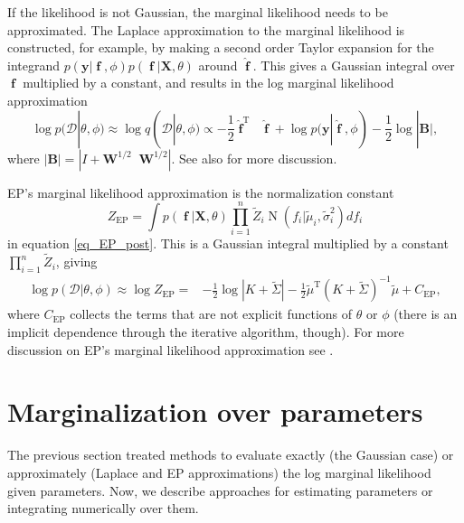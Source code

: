 \documentclass[twoside,11pt]{article}
\DeclareMathOperator{\Kff}{\mathbf{K}_{f,f}}
\DeclareMathOperator{\iKff}{\mathbf{K}_{f,f}^{-1}}
\DeclareMathOperator{\f}{\mathbf{f}}
\DeclareMathOperator{\N}{N}
\newcommand{\mb}{\mathbf}
\begin{document}
If the likelihood is not Gaussian, the marginal likelihood needs to be
approximated. The Laplace approximation to the marginal likelihood is
constructed, for example, by making a second order Taylor expansion
for the integrand $p(\mb{y}|\f,\phi)p(\f|\mb{X},\theta)$ around
$\hat{\f}$. This gives a Gaussian integral over $\f$ multiplied by a
constant, and results in the log marginal likelihood approximation
%
\begin{equation}\label{eq_Laplace_marginal_likelihood}
\log p(\mathcal{D}|\theta,\phi) \approx \log
q(\mathcal{D}|\theta,\phi) \propto
-\frac{1}{2}\hat{\f}^{\text{T}}\iKff\hat{\f} + \log p(\mb{y}|\hat{\f},\phi)
- \frac{1}{2} \log |\mb{B}|,  
\end{equation}
%
where $|\mb{B}| = |I+\mb{W}^{1/2}\Kff \mb{W}^{1/2}|$. See also
\citep[][]{Tierney+Kadane:1986,Rue+Martino+Chopin:2009,Vanhatalo+Jylanki+Vehtari:2009}
for more discussion.

EP's marginal likelihood approximation is the normalization constant
%
\begin{equation}
Z_{\text{EP}} = \int p(\f|\mb{X}, \theta)\prod_{i=1}^n \tilde{Z}_i
\N(f_i|\tilde{\mu}_i,\tilde{\sigma}_i^2) d f_i 
\end{equation}
%
in equation \eqref{eq_EP_post}. This is a Gaussian integral multiplied
by a constant $\prod_{i=1}^n \tilde{Z}_i$, giving
%
\begin{align}\label{EP_marg_likelih}
\log p(\mathcal{D}|\theta,\phi) \approx \log Z_{\text{EP}} =&  -\frac{1}{2} \log|K+\tilde{\Sigma}|
-\frac{1}{2}\tilde{\mu}^{\text{T}} \left(K+\tilde{\Sigma}
\right)^{-1}\tilde{\mu} + C_{\text{EP}},
\end{align}
%
where $C_{\text{EP}}$ collects the terms that are not explicit
functions of $\theta$ or $\phi$ (there is an implicit dependence
through the iterative algorithm, though). For more discussion on EP's
marginal likelihood approximation see
\citep{Seeger:2005,Nickisch+Rasmussen:2008}.

\section{Marginalization over parameters}\label{sec_marginalization_over_hyperparam}

The previous section treated methods to evaluate exactly (the Gaussian
case) or approximately (Laplace and EP approximations) the log
marginal likelihood given parameters. Now, we describe approaches for
estimating parameters or integrating numerically over them.
\end{document}
